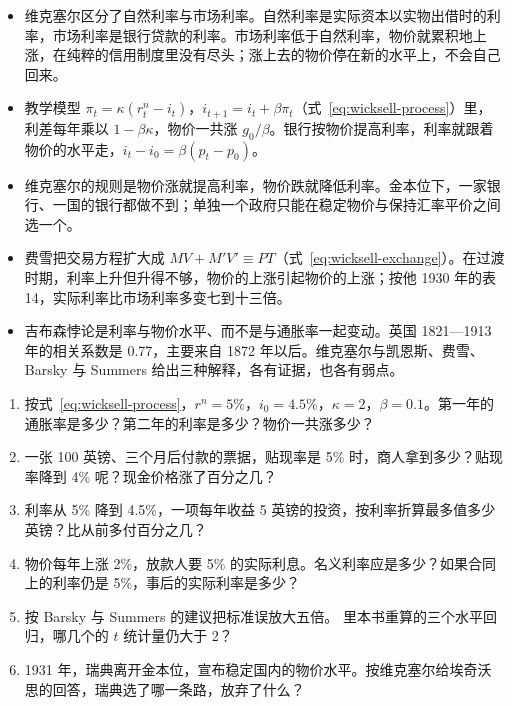 \begin{takeaways}
\begin{itemize}
\item 维克塞尔区分了自然利率与市场利率。自然利率是实际资本以实物出借时的利率，市场利率是银行贷款的利率。市场利率低于自然利率，物价就累积地上涨，在纯粹的信用制度里没有尽头；涨上去的物价停在新的水平上，不会自己回来。
\item 教学模型 $\pi_t=\kappa(r^{n}_t-i_t)$，$i_{t+1}=i_t+\beta\pi_t$（式~\eqref{eq:wicksell-process}）里，利差每年乘以 $1-\beta\kappa$，物价一共涨 $g_0/\beta$。银行按物价提高利率，利率就跟着物价的水平走，$i_t-i_0=\beta(p_t-p_0)$。
\item 维克塞尔的规则是物价涨就提高利率，物价跌就降低利率。金本位下，一家银行、一国的银行都做不到；单独一个政府只能在稳定物价与保持汇率平价之间选一个。
\item 费雪把交易方程扩大成 $MV+M'V'\equiv PT$（式~\eqref{eq:wicksell-exchange}）。在过渡时期，利率上升但升得不够，物价的上涨引起物价的上涨；按他 1930 年的表 14，实际利率比市场利率多变七到十三倍。
\item 吉布森悖论是利率与物价水平、而不是与通胀率一起变动。英国 1821—1913 年的相关系数是 0.77，主要来自 1872 年以后。维克塞尔与凯恩斯、费雪、Barsky 与 Summers 给出三种解释，各有证据，也各有弱点。
\end{itemize}
\end{takeaways}

\begin{selfcheck}
\begin{enumerate}
\item 按式~\eqref{eq:wicksell-process}，$r^{n}=5\%$，$i_0=4.5\%$，$\kappa=2$，$\beta=0.1$。第一年的通胀率是多少？第二年的利率是多少？物价一共涨多少？
\item 一张 100 英镑、三个月后付款的票据，贴现率是 5\% 时，商人拿到多少？贴现率降到 4\% 呢？现金价格涨了百分之几？
\item 利率从 5\% 降到 4.5\%，一项每年收益 5 英镑的投资，按利率折算最多值多少英镑？比从前多付百分之几？
\item 物价每年上涨 2\%，放款人要 5\% 的实际利息。名义利率应是多少？如果合同上的利率仍是 5\%，事后的实际利率是多少？
\item 按 Barsky 与 Summers 的建议把标准误放大五倍。 里本书重算的三个水平回归，哪几个的 $t$ 统计量仍大于 2？
\item 1931 年，瑞典离开金本位，宣布稳定国内的物价水平。按维克塞尔给埃奇沃思的回答，瑞典选了哪一条路，放弃了什么？
\end{enumerate}
\end{selfcheck}

